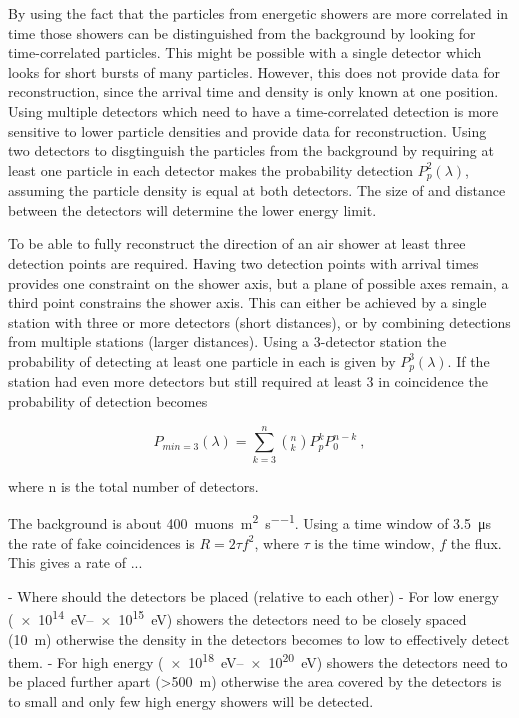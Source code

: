 By using the fact that the particles from energetic showers are more correlated in time those showers can be distinguished from the background by looking for time-correlated particles. This might be possible with a single detector which looks for short bursts of many particles. However, this does not provide data for reconstruction, since the arrival time and density is only known at one position. Using multiple detectors which need to have a time-correlated detection is more sensitive to lower particle densities and provide data for reconstruction. Using two detectors to disgtinguish the particles from the background by requiring at least one particle in each detector makes the probability detection $P_p^2(\lambda)$, assuming the particle density is equal at both detectors. The size of and distance between the detectors will determine the lower energy limit.

To be able to fully reconstruct the direction of an air shower at least three detection points are required. Having two detection points with arrival times provides one constraint on the shower axis, but a plane of possible axes remain, a third point constrains the shower axis. This can either be achieved by a single station with three or more detectors (short distances), or by combining detections from multiple stations (larger distances). Using a 3-detector station the probability of detecting at least one particle in each is given by $P_p^3(\lambda)$. If the station had even more detectors but still required at least 3 in coincidence the probability of detection becomes

\begin{equation}
    P_{min=3}(\lambda) = \sum_{k=3}^{n} \left(^n_k\right) P_p^k P_0^{n-k} \ ,
\end{equation}

where n is the total number of detectors.

The background is about \SI{400}{muons\per\meter\squared\per\second}. Using a time window of \SI{3.5}{\micro\second} the rate of fake coincidences is $R = 2 \tau f^2$, where $\tau$ is the time window, $f$ the flux. This gives a rate of ...

- Where should the detectors be placed (relative to each other)
    - For low energy (\SIrange{e14}{e15}{\eV}) showers the detectors need to be closely spaced (\SI{10}{\meter}) otherwise the density in the detectors becomes to low to effectively detect them.
    - For high energy (\SIrange{e18}{e20}{\eV}) showers the detectors need to be placed further apart (\SI{>500}{\meter}) otherwise the area covered by the detectors is to small and only few high energy showers will be detected.

